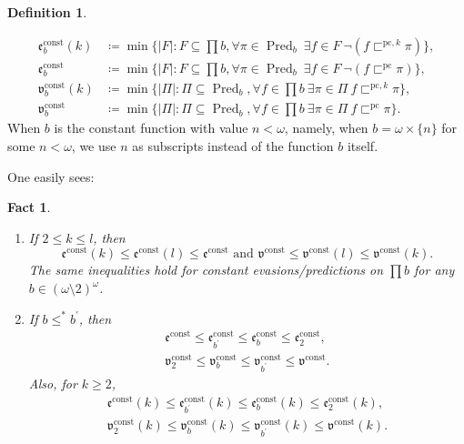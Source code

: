 \documentclass[a4paper,12pt]{amsart}
\newtheorem{fac}[thm]{Fact}
\theoremstyle{definition}
\newtheorem{dfn}[thm]{Definition}
\numberwithin{thm}{section}
\numberwithin{equation}{section}
\newcommand{\ee}{\mathfrak{e}}
\DeclareMathOperator{\Pred}{Pred}
\newcommand{\eec}{\ee^{\mathrm{const}}}
\newcommand{\eeck}{\ee^{\mathrm{const}}(k)}
\newcommand{\vv}{\mathfrak{v}}
\newcommand{\vvc}{\vv^{\mathrm{const}}}
\newcommand{\vvck}{\vv^{\mathrm{const}}(k)}
\newcommand{\pc}{\sqsubset^{\mathrm{pc}}}
\newcommand{\pck}{\sqsubset^{\mathrm{pc},k}}
\begin{document}
\begin{dfn}
\begin{itemize}
            \begin{align*}
				\eec_b(k) & \coloneqq\min\{|F|:F\subseteq\textstyle\prod b,\forall \pi\in \Pred_b~\exists f\in F~ \lnot(f\pck\pi)\},\\
                \eec_b & \coloneqq\min\{|F|:F\subseteq\textstyle\prod b,\forall \pi\in \Pred_b~\exists f\in F~ \lnot(f\pc\pi)\},\\
				\vvc_b(k) & \coloneqq\min\{|\Pi|:\Pi\subseteq \Pred_b,\forall f\in\textstyle\prod b~\exists\pi\in \Pi~ f \pck \pi\},\\
                \vvc_b & \coloneqq\min\{|\Pi|:\Pi\subseteq \Pred_b,\forall f\in\textstyle\prod b~\exists\pi\in \Pi~ f \pc \pi\}.
		      \end{align*}
            When $b$ is the constant function with value $n<\omega$, namely, when $b=\omega\times\{n\}$ for some $n<\omega$, we use $n$ as subscripts instead of the function $b$ itself.
        \end{itemize}
    \end{dfn}

    One easily sees:
    \begin{fac}\leavevmode
        \begin{enumerate}
            \item If $2\leq k\leq l$, then
            \[\eeck\leq\eec(l)\leq\eec\text{ and }\vvc\leq\vvc(l)\leq\vvck.
            \]The same inequalities hold for constant evasions/predictions on $\prod b$ for any $b\in(\omega\setminus2)^\omega$.
            \item If $b\leq^*b^\prime$, then
            \begin{align*}
                \eec\leq \eec_{b^\prime}\leq \eec_b\leq\eec_2,\\
                \vvc_2\leq\vvc_b\leq\vvc_{b^\prime}\leq\vvc.
            \end{align*}
            Also, for $k\geq 2$,
            \begin{align*}
                \eec(k)\leq \eec_{b^\prime}(k)\leq \eec_b(k)\leq\eec_2(k),\\
                \vvc_2(k)\leq\vvc_b(k)\leq\vvc_{b^\prime}(k)\leq\vvc(k).
            \end{align*}
        \end{enumerate}
    \end{fac}
  
\end{document}
